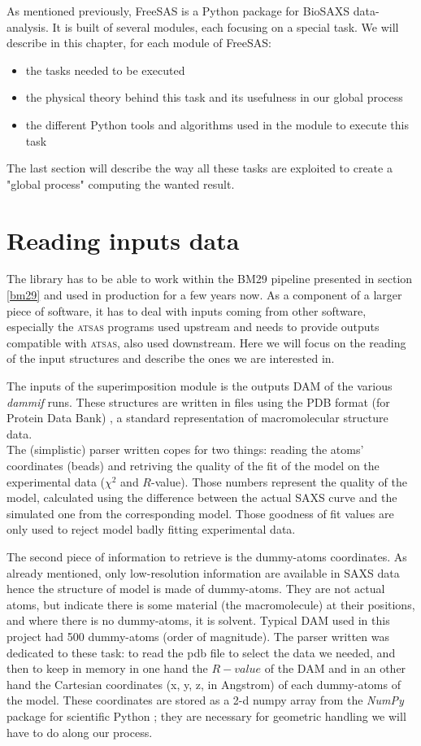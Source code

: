 \documentclass[a4paper, 11pt]{report}
\begin{document}
As mentioned previously, FreeSAS is a Python package for BioSAXS data-
analysis. 
It is built of several modules, each focusing on a special task. 
We will describe in this chapter, for each module of FreeSAS:
\begin{itemize}
 \item the tasks needed to be executed
 \item the physical theory behind this task and its usefulness in our 
       global process
 \item the different Python tools and algorithms used in the module to 
       execute this task
\end{itemize}
The last section will describe the way all these tasks are exploited 
to create a "global process" computing the wanted result. 

\section{Reading inputs data}

The library has to be able to work within the BM29 pipeline presented 
in section \ref{bm29} and used in production for a few years  now. 
As a component of a larger piece of software, it has to deal with inputs 
coming from other software, especially the \textsc{atsas} programs used
upstream and needs to provide outputs compatible with \textsc{atsas}, also used
downstream.
Here we will focus on the reading of the input structures and describe the
ones we are interested in.

The inputs of the superimposition module is the
outputs DAM of the various \textit{dammif} runs. 
These structures are written in files using the PDB format (for 
Protein Data Bank) \cite{pdb}, a standard representation of 
macromolecular structure data.\\
The (simplistic) parser written copes for two things: reading the atoms'
coordinates (beads) and retriving the quality of the fit of the model on the
experimental data ($\chi^2$ and $R$-value).
Those numbers represent the quality of the model, calculated using the 
difference between the actual SAXS curve and the simulated one from the
corresponding model. 
Those goodness of fit values are only used to reject model badly fitting
experimental data.

The second piece of information to retrieve is the dummy-atoms coordinates. 
As already mentioned, only low-resolution information are available in SAXS data 
hence the structure of model is made of dummy-atoms.
They are not actual atoms, but indicate there is 
some material (the macromolecule) at their positions, and where there is
no dummy-atoms, it is solvent. 
Typical DAM used in this project had 500 dummy-atoms (order of magnitude).
The parser written was dedicated to these task: to read the pdb file 
to select the data we needed, and then to keep in memory in one hand 
the $R-value$ of the DAM and in an other hand the Cartesian coordinates (x, y, 
z, in Angstrom) of each dummy-atoms of the model. 
These coordinates are stored as a 2-d numpy array from the 
\textit{NumPy} package for scientific Python \cite{numpy}; they are 
necessary for geometric handling we will have to do along our process.
\end{document}

